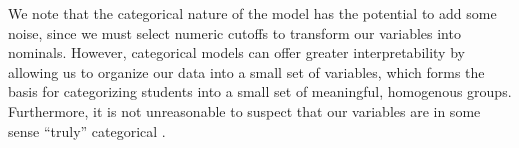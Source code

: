 \documentclass{edm_template}
\begin{document}
We note that the categorical nature of the model has the potential to add some noise, since we must select numeric cutoffs to transform our variables into nominals. However, categorical models can offer greater interpretability by allowing us to organize our data into a small set of variables, which forms the basis for categorizing students into a small set of meaningful, homogenous groups. Furthermore, it is not unreasonable to suspect that our variables are in some sense ``truly'' categorical \cite[pp8--9]{Collins2009}. 



\end{document}
